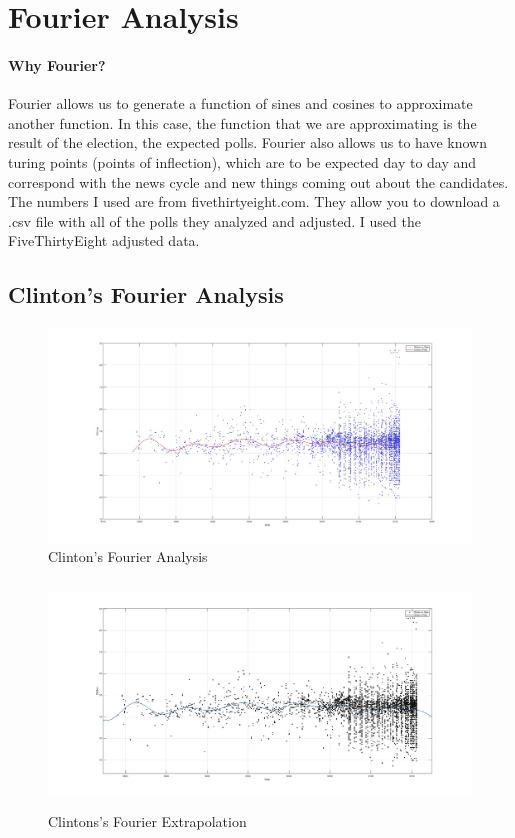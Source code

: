 \documentclass[twoside]{article}
\begin{document}
              \section{Fourier Analysis}
              \vskip4cm
              \paragraph{Why Fourier?} Fourier allows us to generate a function of sines and cosines to approximate another function. In this case, the function that we are approximating
              is the result of the election, the expected polls. Fourier also allows us to have known turing points (points of inflection), which are to be expected day to day and correspond
              with the news cycle and new things coming out about the candidates. The numbers I used are from fivethirtyeight.com. They allow you to download a .csv file with all of the polls they
              analyzed and adjusted. I used the FiveThirtyEight adjusted data.

              \newpage
              \subsection{Clinton's Fourier Analysis}
              \begin{figure}[H]
                \centering
                \includegraphics[width=\textwidth]{images/fourier/clinton.jpg}
                \caption{Clinton's Fourier Analysis}
              \end{figure}
              \begin{figure}[H]
                \centering
                \includegraphics[width=\textwidth,height=6cm]{images/fourier/clintonlarge.jpg}
                \caption{Clintons's Fourier Extrapolation}
              \end{figure}
\end{document}
